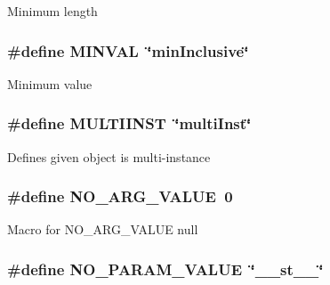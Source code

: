 Minimum length \hypertarget{group__LIBHELP_ga80b22c555ddadb47cc6ca338a9c49126}{
\subsubsection[{M\-I\-N\-V\-A\-L}]{\setlength{\rightskip}{0pt plus 5cm}\#define M\-I\-N\-V\-A\-L~\char`\"{}min\-Inclusive\char`\"{}}}\label{group__LIBHELP_ga80b22c555ddadb47cc6ca338a9c49126}
Minimum value \hypertarget{group__LIBHELP_ga986e1b45ade6c34d0d399c08b933da6b}{
\subsubsection[{M\-U\-L\-T\-I\-I\-N\-S\-T}]{\setlength{\rightskip}{0pt plus 5cm}\#define M\-U\-L\-T\-I\-I\-N\-S\-T~\char`\"{}multi\-Inst\char`\"{}}}\label{group__LIBHELP_ga986e1b45ade6c34d0d399c08b933da6b}
Defines given object is multi-\/instance \hypertarget{group__LIBHELP_ga7f24a1abca37046fc42297fdefe88335}{
\subsubsection[{N\-O\-\_\-\-A\-R\-G\-\_\-\-V\-A\-L\-U\-E}]{\setlength{\rightskip}{0pt plus 5cm}\#define N\-O\-\_\-\-A\-R\-G\-\_\-\-V\-A\-L\-U\-E~0}}\label{group__LIBHELP_ga7f24a1abca37046fc42297fdefe88335}
Macro for N\-O\-\_\-\-A\-R\-G\-\_\-\-V\-A\-L\-U\-E null \hypertarget{group__LIBHELP_ga7e8ff82fbeb5ab553867da272db7f59e}{
\subsubsection[{N\-O\-\_\-\-P\-A\-R\-A\-M\-\_\-\-V\-A\-L\-U\-E}]{\setlength{\rightskip}{0pt plus 5cm}\#define N\-O\-\_\-\-P\-A\-R\-A\-M\-\_\-\-V\-A\-L\-U\-E~\char`\"{}\-\_\-\-\_\-st\-\_\-\-\_\-\char`\"{}}}\label{group__LIBHELP_ga7e8ff82fbeb5ab553867da272db7f59e}
